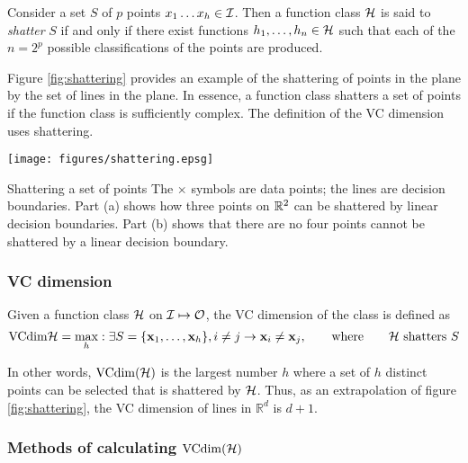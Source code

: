 \begin{definition}[Shattering]
Consider a set $S$ of $p$ points $x_1 \ldots x_h \in \mathcal{I}$.  Then a
function class $\mathcal{H}$ is said to \emph{shatter} $S$ if and only if
there exist functions $h_1, \ldots, h_n \in \mathcal{H}$ such that each of
the $n = 2^p$ possible classifications of the points are produced.
\end{definition}

Figure \ref{fig:shattering} provides an example of the shattering of
points in the plane by the set of lines in the plane.  In essence, a
function class shatters a set of points if the function class is
sufficiently complex.  The definition of the VC dimension uses shattering.

\begin{linefigure}
\begin{center}
\texttt{[image: figures/shattering.epsg]}
\end{center}
\label{fig:shattering}
\begin{capt}{Shattering a set of points}
The $\times$ symbols are data points; the lines are decision boundaries.
Part (a) shows how three points on $\mathbb{R}^2$ can be shattered by linear
decision boundaries.  Part (b) shows that there are no four points
cannot be shattered by a linear decision boundary.
\end{capt}
\end{linefigure}


\subsubsection{VC dimension}

\begin{definition}[VC dimension]
Given a function class $\mathcal{H}$ on $\mathcal{I} \mapsto \mathcal{O}$, the VC
dimension of the class is defined as
%
\begin{equation}
\mathrm{VCdim}{\mathcal{H}} = \max_{h} : \exists S = \{\mathbf{x}_1, \ldots, \mathbf{x}_h\},
i \neq j \rightarrow \mathbf{x}_i \neq \mathbf{x}_j,
\qquad \mbox{where} \qquad \mbox{\ensuremath{\mathcal{H}}\ shatters $S$}
\end{equation}
\end{definition}

In other words, $\mathrm{VCdim}(\mathcal{H})$ is the largest number $h$ where
a set of $h$ distinct points can be selected that is shattered by
$\mathcal{H}$.  Thus, as an extrapolation of figure \ref{fig:shattering},
the VC dimension of lines in $\mathbb{R}^d$ is $d+1$.


\subsubsection{Methods of calculating $\mathrm{VCdim}(\mathcal{H})$}

